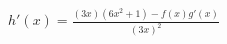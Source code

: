 \documentclass[preview]{standalone}
\begin{document}
\begin{align*}
h'(x) = \frac{(3x)(6x^2+1)-f(x)g'(x)}{(3x)^2}
\end{align*}
\end{document}
